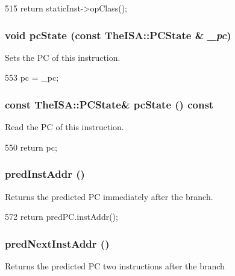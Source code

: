 \begin{DoxyCode}
515 { return staticInst->opClass(); }
\end{DoxyCode}
\hypertarget{classInOrderDynInst_a2e93bda333333e09701e1c003e3ba9a1}{
\subsubsection[{pcState}]{\setlength{\rightskip}{0pt plus 5cm}void pcState (const TheISA::PCState \& {\em \_\-pc})}}
\label{classInOrderDynInst_a2e93bda333333e09701e1c003e3ba9a1}
Sets the PC of this instruction. 


\begin{DoxyCode}
553 { pc = _pc; }
\end{DoxyCode}
\hypertarget{classInOrderDynInst_a64fbed294723453b88abc510f3112df5}{
\subsubsection[{pcState}]{\setlength{\rightskip}{0pt plus 5cm}const TheISA::PCState\& pcState () const}}
\label{classInOrderDynInst_a64fbed294723453b88abc510f3112df5}
Read the PC of this instruction. 


\begin{DoxyCode}
550 { return pc; }
\end{DoxyCode}
\hypertarget{classInOrderDynInst_aaf7104129d287861faf7fe235f4116e7}{
\subsubsection[{predInstAddr}]{ predInstAddr ()}}
\label{classInOrderDynInst_aaf7104129d287861faf7fe235f4116e7}
Returns the predicted PC immediately after the branch. 


\begin{DoxyCode}
572 { return predPC.instAddr(); }
\end{DoxyCode}
\hypertarget{classInOrderDynInst_aabf159b9ae9ff5a404a04ef091d1f2d1}{
\subsubsection[{predNextInstAddr}]{ predNextInstAddr ()}}
\label{classInOrderDynInst_aabf159b9ae9ff5a404a04ef091d1f2d1}
Returns the predicted PC two instructions after the branch 



